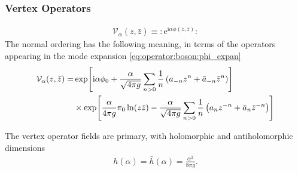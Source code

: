 \documentclass[10pt]{article}
\newcommand{\me}{\mathrm{e}}
\newcommand{\ii}{\mathrm{i}}
\begin{document}
\subsubsection{Vertex Operators}
\begin{align}
    \mathcal{V}_\alpha(z,\bar{z})\equiv:\me^{\ii\alpha\phi(z,\bar{z})}:
\end{align}
The normal ordering has the following meaning, in terms of the operators appearing in the mode expansion \cref{eq:operator:boson:phi_expan}
\begin{align}
    \mathcal{V}_\alpha(z,\bar{z})= & \exp[\ii\alpha\phi_0+\frac{\alpha}{\sqrt{4\pi g}}\sum_{n>0}\frac{1}{n}\left(a_{-n}z^n+\bar{a}_{-n}\bar{z}^n\right)]\notag                            \\
                                   & \times\exp[\frac{\alpha}{4\pi g}\pi_0 \ln(z\bar{z})-\frac{\alpha}{\sqrt{4\pi g}}\sum_{n>0}\frac{1}{n}\left(a_n z^{-n}+\bar{a}_n \bar{z}^{-n}\right)]
\end{align}
\begin{claim}
    The vertex operator fields are primary, with holomorphic and antiholomorphic dimensions
    \begin{align}
        h(\alpha)=\bar{h}(\alpha)=\frac{\alpha^2}{8\pi g}.
    \end{align}
\end{claim}
\end{document}
